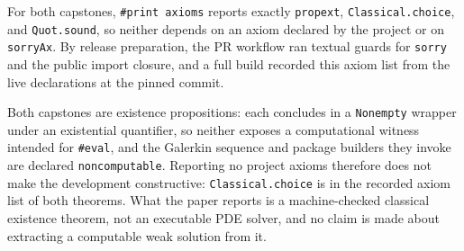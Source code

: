For both capstones, \texttt{\#print axioms} reports exactly
\texttt{propext}, \texttt{Classical.choice}, and \texttt{Quot.sound}, so
neither depends on an axiom declared by the project or on
\texttt{sorryAx}. By release preparation, the PR workflow ran textual
guards for \texttt{sorry} and the public import closure, and a full build
recorded this axiom list from the live declarations at the pinned
commit. %

Both capstones are existence propositions: each concludes in a
\texttt{Nonempty} wrapper under an existential quantifier, so neither
exposes a computational witness intended for \texttt{\#eval}, and the
Galerkin sequence and package
builders they invoke are declared \texttt{noncomputable}. Reporting no
project axioms therefore does not make the development constructive:
\texttt{Classical.choice} is in the recorded axiom list of both theorems.
What the paper reports is a machine-checked classical existence theorem,
not an executable PDE solver, and no claim is made about extracting a
computable weak solution from it. %
